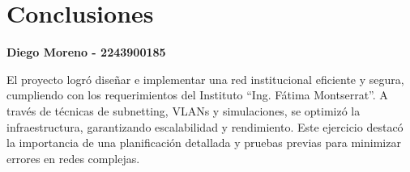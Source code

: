 \section{Conclusiones}
\textbf{Diego Moreno - 2243900185}

El proyecto logró diseñar e implementar una red institucional eficiente y segura, cumpliendo con los requerimientos del Instituto “Ing. Fátima Montserrat”. A través de técnicas de subnetting, VLANs y simulaciones, se optimizó la infraestructura, garantizando escalabilidad y rendimiento. Este ejercicio destacó la importancia de una planificación detallada y pruebas previas para minimizar errores en redes complejas.